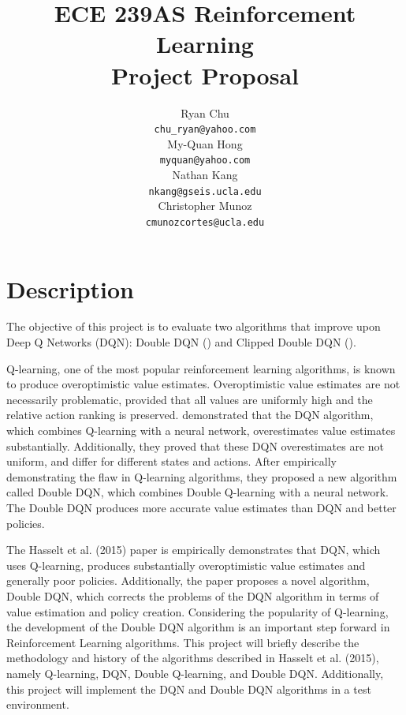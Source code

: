 \documentclass{article}
\title{ECE 239AS Reinforcement Learning\\
       Project Proposal}
\author{%
    Ryan Chu \\
    \texttt{chu\_ryan@yahoo.com}\\
    \And
    My-Quan Hong \\
    \texttt{myquan@yahoo.com} \\
    \And
    Nathan Kang \\
    \texttt{nkang@gseis.ucla.edu} \\
    \And
    Christopher Munoz \\
    \texttt{cmunozcortes@ucla.edu} \\
}
\begin{document}
\maketitle

\section{Description}



The objective of this project is to evaluate two algorithms that improve upon
Deep Q Networks (DQN): Double DQN (\citet{van2016deep}) and Clipped Double
DQN (\citet{fujimoto2018addressing}).

Q-learning, one of the most popular reinforcement learning algorithms,
is known to produce overoptimistic value estimates. Overoptimistic value
estimates are not necessarily problematic, provided that all values are
uniformly high and the relative action ranking is preserved.
\citet{van2016deep} demonstrated that the DQN algorithm, which combines
Q-learning with a neural network, overestimates value estimates substantially.
Additionally, they proved that these DQN overestimates are not
uniform, and differ for different states and actions. After empirically
demonstrating the flaw in Q-learning algorithms, they proposed a new algorithm
called Double DQN, which combines Double Q-learning with a neural network. The 
Double DQN produces more accurate value estimates than DQN and better policies.

The Hasselt et al. (2015) paper is empirically demonstrates that  DQN, which
uses Q-learning, produces substantially overoptimistic value estimates and
generally poor policies.  Additionally, the paper proposes a novel algorithm,
Double DQN, which corrects the problems of the DQN algorithm in terms of value
estimation and policy creation. Considering the popularity of Q-learning, the
development of the Double DQN algorithm is an important step forward in
Reinforcement Learning algorithms. This project will briefly describe the
methodology and history of the algorithms described in Hasselt et al. (2015),
namely Q-learning, DQN, Double Q-learning, and Double DQN.  Additionally, this
project will implement the DQN and Double DQN algorithms in a test environment.
\end{document}
